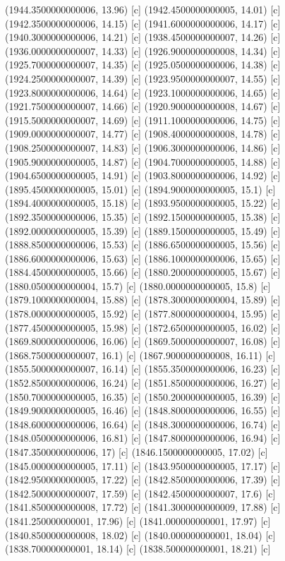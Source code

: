 {{{(1944.3500000000006, 13.96) [c] 
(1942.4500000000005, 14.01) [c] 
(1942.3500000000006, 14.15) [c] 
(1941.6000000000006, 14.17) [c] 
(1940.3000000000006, 14.21) [c] 
(1938.4500000000007, 14.26) [c] 
(1936.0000000000007, 14.33) [c] 
(1926.9000000000008, 14.34) [c] 
(1925.7000000000007, 14.35) [c] 
(1925.0500000000006, 14.38) [c] 
(1924.2500000000007, 14.39) [c] 
(1923.9500000000007, 14.55) [c] 
(1923.8000000000006, 14.64) [c] 
(1923.1000000000006, 14.65) [c] 
(1921.7500000000007, 14.66) [c] 
(1920.9000000000008, 14.67) [c] 
(1915.5000000000007, 14.69) [c] 
(1911.1000000000006, 14.75) [c] 
(1909.0000000000007, 14.77) [c] 
(1908.4000000000008, 14.78) [c] 
(1908.2500000000007, 14.83) [c] 
(1906.3000000000006, 14.86) [c] 
(1905.9000000000005, 14.87) [c] 
(1904.7000000000005, 14.88) [c] 
(1904.6500000000005, 14.91) [c] 
(1903.8000000000006, 14.92) [c] 
(1895.4500000000005, 15.01) [c] 
(1894.9000000000005, 15.1) [c] 
(1894.4000000000005, 15.18) [c] 
(1893.9500000000005, 15.22) [c] 
(1892.3500000000006, 15.35) [c] 
(1892.1500000000005, 15.38) [c] 
(1892.0000000000005, 15.39) [c] 
(1889.1500000000005, 15.49) [c] 
(1888.8500000000006, 15.53) [c] 
(1886.6500000000005, 15.56) [c] 
(1886.6000000000006, 15.63) [c] 
(1886.1000000000006, 15.65) [c] 
(1884.4500000000005, 15.66) [c] 
(1880.2000000000005, 15.67) [c] 
(1880.0500000000004, 15.7) [c] 
(1880.0000000000005, 15.8) [c] 
(1879.1000000000004, 15.88) [c] 
(1878.3000000000004, 15.89) [c] 
(1878.0000000000005, 15.92) [c] 
(1877.8000000000004, 15.95) [c] 
(1877.4500000000005, 15.98) [c] 
(1872.6500000000005, 16.02) [c] 
(1869.8000000000006, 16.06) [c] 
(1869.5000000000007, 16.08) [c] 
(1868.7500000000007, 16.1) [c] 
(1867.9000000000008, 16.11) [c] 
(1855.5000000000007, 16.14) [c] 
(1855.3500000000006, 16.23) [c] 
(1852.8500000000006, 16.24) [c] 
(1851.8500000000006, 16.27) [c] 
(1850.7000000000005, 16.35) [c] 
(1850.2000000000005, 16.39) [c] 
(1849.9000000000005, 16.46) [c] 
(1848.8000000000006, 16.55) [c] 
(1848.6000000000006, 16.64) [c] 
(1848.3000000000006, 16.74) [c] 
(1848.0500000000006, 16.81) [c] 
(1847.8000000000006, 16.94) [c] 
(1847.3500000000006, 17) [c] 
(1846.1500000000005, 17.02) [c] 
(1845.0000000000005, 17.11) [c] 
(1843.9500000000005, 17.17) [c] 
(1842.9500000000005, 17.22) [c] 
(1842.8500000000006, 17.39) [c] 
(1842.5000000000007, 17.59) [c] 
(1842.4500000000007, 17.6) [c] 
(1841.8500000000008, 17.72) [c] 
(1841.3000000000009, 17.88) [c] 
(1841.250000000001, 17.96) [c] 
(1841.000000000001, 17.97) [c] 
(1840.8500000000008, 18.02) [c] 
(1840.000000000001, 18.04) [c] 
(1838.700000000001, 18.14) [c] 
(1838.500000000001, 18.21) [c] 
}}}
